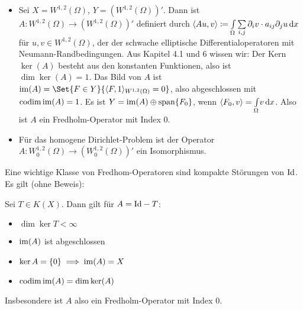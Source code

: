 \documentclass{cheat-sheet}
\newcommand{\codim}{\mathrm{codim}} %
\begin{document}
\begin{bspe}
  \begin{itemize}
    \item Sei $X = W^{1,2}(\Omega)$, $Y = (W^{1,2}(\Omega))'$. Dann ist $A : W^{1,2}(\Omega) \to (W^{1,2}(\Omega))'$ definiert durch $\langle Au, v \rangle \coloneqq \Int{\Omega}{}{\sum_{i,j} \partial_i v \cdot a_{ij} \partial_j u}{x}$ für $u , v \in W^{1,2}(\Omega)$, der der schwache elliptische Differentialoperatoren mit Neumann-Randbedingungen. Aus Kapitel 4.1 und 6 wissen wir: Der Kern $\ker(A)$ besteht aus den konstanten Funktionen, also ist $\dim \ker(A) = 1$. Das Bild von $A$ ist $\im(A) = \Set{ F \in Y }{ \langle F, 1 \rangle_{W^{1,2}(\Omega)} = 0 }$, also abgeschlossen mit $\codim \im(A) = 1$. Es ist $Y = \mathop{\mathrm{im}}(A) \oplus \mathrm{span} \{ F_0 \}$, wenn $\langle F_0 , v \rangle = {\textstyle \int\limits_{\Omega}^{}} v \,\mathrm{d} x$. Also ist $A$ ein Fredholm-Operator mit Index $0$.
    \item Für das homogene Dirichlet-Problem ist der Operator $A : W_0^{1,2}(\Omega) \to (W_0^{1,2}(\Omega))'$ ein Isomorphismus.
  \end{itemize}
\end{bspe}

Eine wichtige Klasse von Fredhom-Operatoren sind kompakte Störungen von $\mathrm{Id}$. Es gilt (ohne Beweis):

\begin{satz}
  Sei $T \in K(X)$. Dann gilt für $A = \mathrm{Id} - T$:
  \begin{itemize}
    \item $\dim \ker T < \infty$
    \item $\mathop{\mathrm{im}}(A)$ ist abgeschlossen
    \item $\ker A = \{ 0 \} \implies \mathop{\mathrm{im}}(A) = X$
    \item $\codim \im(A) = \dim \ker(A)$
  \end{itemize}
  Insbesondere ist $A$ also ein Fredholm-Operator mit Index $0$.
\end{satz}
\end{document}
